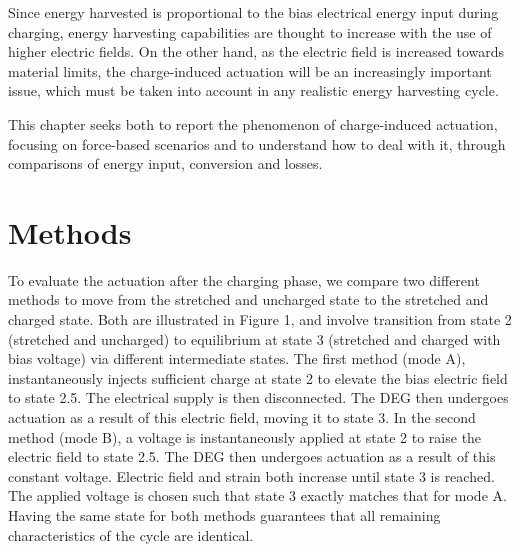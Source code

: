 Since energy harvested is proportional to the bias electrical energy input during charging, energy harvesting capabilities are thought to increase with the use of higher electric fields. On the other hand, as the electric field is increased towards material limits, the charge-induced actuation will be an increasingly important issue, which must be taken into account in any realistic energy harvesting cycle.

This chapter seeks both to report the phenomenon of charge-induced actuation, focusing on force-based scenarios and to understand how to deal with it, through comparisons of energy input, conversion and losses. 

\section{Methods}
\label{sec:methods}
To evaluate the actuation after the charging phase, we compare two different methods to move from the stretched and uncharged state to the stretched and charged state. Both are illustrated in Figure 1, and involve transition from state 2 (stretched and uncharged) to equilibrium at state 3 (stretched and charged with bias voltage) via different intermediate states. The first method (mode A), instantaneously injects sufficient charge at state 2 to elevate the bias electric field to state 2.5\textquotesingle.  The electrical supply is then disconnected. The DEG then undergoes actuation as a result of this electric field, moving it to state 3.  In the second method (mode B), a voltage is instantaneously applied at state 2 to raise the electric field to state 2.5\textquotedbl. The DEG then undergoes actuation as a result of this constant voltage. Electric field and strain both increase until state 3 is reached.  The applied voltage is chosen such that state 3 exactly matches that for mode A. Having the same state for both methods guarantees that all remaining characteristics of the cycle are identical. 

